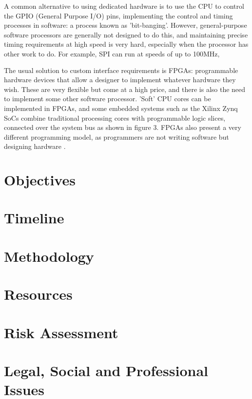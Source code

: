 \documentclass[a4paper,fleqn,12pt]{article}
\begin{document}
A common alternative to using dedicated hardware is to use the CPU to control the GPIO (General Purpose I/O) pins, implementing the control and timing processes in software: a process known as 'bit-banging'. However, general-purpose software processors are generally not designed to do this, and maintaining precise timing requirements at high speed is very hard, especially when the processor has other work to do. For example, SPI can run at speeds of up to 100MHz,

The usual solution to custom interface requirements is FPGAs: programmable hardware devices that allow a designer to implement whatever hardware they wish. These are very flexible but come at a high price, and there is also the need to implement some other software processor. 'Soft' CPU cores can be implemented in FPGAs, and some embedded systems such as the Xilinx Zynq SoCs combine traditional processing cores with programmable logic slices, connected over the system bus as shown in figure 3. FPGAs also present a very different programming model, as programmers are not writing software but designing hardware \citep{picosdk}.

\section{Objectives}
\section{Timeline}
\section{Methodology}
\section{Resources}
\section{Risk Assessment}
\section{Legal, Social and Professional Issues}


\end{document}
